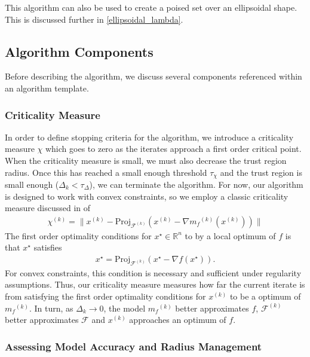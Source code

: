 \documentclass{article}
\theoremstyle{case}
\newcommand{\xk}{{x^{(k)}}}
\newcommand{\Rn}{\mathbb R^n}
\newcommand{\dk}{\Delta_k}
\newcommand{\mfk}{{{m}_f}^{(k)}}
\newcommand{\feasible}{{\mathcal F}}
\newcommand{\feasiblek}{{\mathcal F^{(k)}}}
\newcommand{\chik}{{\chi^{(k)}}}
\newcommand{\gradf}{\nabla f}
\begin{document}
This algorithm can also be used to create a poised set over an ellipsoidal shape.
This is discussed further in \cref{ellipsoidal_lambda}.



\subsection{Algorithm Components}

Before describing the algorithm, we discuss several components referenced within an algorithm template.

\subsubsection{Criticality Measure}

In order to define stopping criteria for the algorithm, we introduce a criticality measure $\chi$ which goes to zero as the iterates approach a first order critical point.
When the criticality measure is small, we must also decrease the trust region radius.
Once this has reached a small enough threshold $\tau_{\chi}$ and the trust region is small enough ($\Delta_k < \tau_{\Delta}$), we can terminate the algorithm.
For now, our algorithm is designed to work with convex constraints, so we employ a classic criticality measure discussed in \cite{ConnGoulToin00} of
\begin{align}
\label{critical}
\chik = \|\xk - \text{Proj}_{\feasiblek}(\xk- \nabla \mfk(\xk))\|
\end{align}
The first order optimality conditions for $x^{\star} \in \Rn$ to by a local optimum of $f$ is that $x^{\star}$ satisfies
\begin{align*}
x^{\star} = \text{Proj}_{\feasiblek}\left(x^{\star} - \gradf(x^{\star})\right).
\end{align*}
For convex constraints, this condition is necessary and sufficient under regularity assumptions.
Thus, our criticality measure measures how far the current iterate is from satisfying the first order optimality conditions for $\xk$ to be a optimum of $\mfk$.
In turn, as $\dk \to 0$, the model $\mfk$ better approximates $f$, $\feasiblek$ better approximates $\feasible$ and $\xk$ approaches an optimum of $f$.

\subsubsection{Assessing Model Accuracy and Radius Management}
\end{document}
